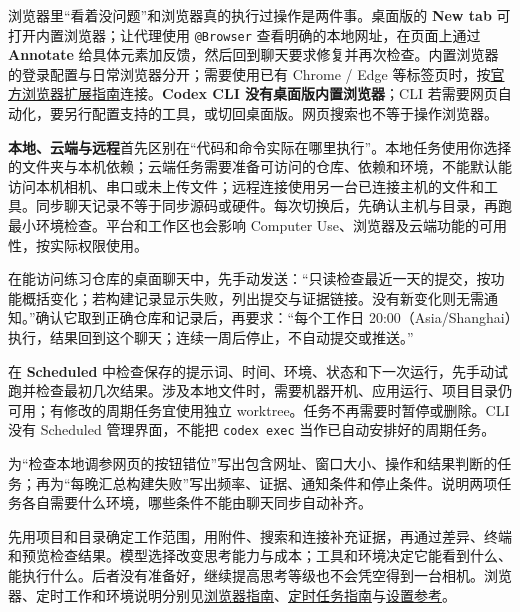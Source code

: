 浏览器里“看着没问题”和浏览器真的执行过操作是两件事。桌面版的 \textbf{New tab} 可打开内置浏览器；让代理使用 \texttt{@Browser} 查看明确的本地网址，在页面上通过 \textbf{Annotate} 给具体元素加反馈，然后回到聊天要求修复并再次检查。内置浏览器的登录配置与日常浏览器分开；需要使用已有 Chrome / Edge 等标签页时，按\href{https://learn.chatgpt.com/docs/chrome-extension}{官方浏览器扩展指南}连接。\textbf{Codex CLI 没有桌面版内置浏览器}；CLI 若需要网页自动化，要另行配置支持的工具，或切回桌面版。网页搜索也不等于操作浏览器。

\textbf{本地、云端与远程}首先区别在“代码和命令实际在哪里执行”。本地任务使用你选择的文件夹与本机依赖；云端任务需要准备可访问的仓库、依赖和环境，不能默认能访问本机相机、串口或未上传文件；远程连接使用另一台已连接主机的文件和工具。同步聊天记录不等于同步源码或硬件。每次切换后，先确认主机与目录，再跑最小环境检查。平台和工作区也会影响 Computer Use、浏览器及云端功能的可用性，按实际权限使用。

\begin{example}
在能访问练习仓库的桌面聊天中，先手动发送：“只读检查最近一天的提交，按功能概括变化；若构建记录显示失败，列出提交与证据链接。没有新变化则无需通知。”确认它取到正确仓库和记录后，再要求：“每个工作日 20:00（Asia/Shanghai）执行，结果回到这个聊天；连续一周后停止，不自动提交或推送。”

在 \textbf{Scheduled} 中检查保存的提示词、时间、环境、状态和下一次运行，先手动试跑并检查最初几次结果。涉及本地文件时，需要机器开机、应用运行、项目目录仍可用；有修改的周期任务宜使用独立 worktree。任务不再需要时暂停或删除。CLI 没有 Scheduled 管理界面，不能把 \texttt{codex exec} 当作已自动安排好的周期任务。
\end{example}

\begin{exercise}\label{ex:ai-desktop-tools}
为“检查本地调参网页的按钮错位”写出包含网址、窗口大小、操作和结果判断的任务；再为“每晚汇总构建失败”写出频率、证据、通知条件和停止条件。说明两项任务各自需要什么环境，哪些条件不能由聊天同步自动补齐。
\end{exercise}

\begin{conclusion}
先用项目和目录确定工作范围，用附件、搜索和连接补充证据，再通过差异、终端和预览检查结果。模型选择改变思考能力与成本；工具和环境决定它能看到什么、能执行什么。后者没有准备好，继续提高思考等级也不会凭空得到一台相机。浏览器、定时工作和环境说明分别见\href{https://learn.chatgpt.com/docs/browser}{浏览器指南}、\href{https://learn.chatgpt.com/docs/automations}{定时任务指南}与\href{https://learn.chatgpt.com/docs/reference/settings}{设置参考}。
\end{conclusion}

